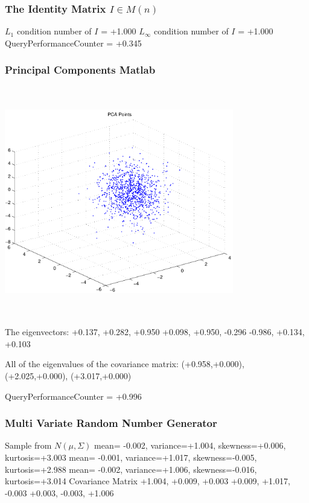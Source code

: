 \documentclass[9pt]{article}
\theoremstyle{plain}
\theoremstyle{definition}
\theoremstyle{remark}
\numberwithin{equation}{section}
\begin{document}
\subsubsection{The Identity Matrix $I \in M(n)$}
$L_1$ condition number of $I$ = +1.000
$L_\infty$ condition number of $I$ = +1.000
QueryPerformanceCounter  =  +0.345
\subsubsection{Principal Components Matlab }
\includegraphics[width=10.0cm,height=10.0cm]{PCAPoints.pdf}

The eigenvectors:
+0.137, +0.282, +0.950
+0.098, +0.950, -0.296
-0.986, +0.134, +0.103

All of the eigenvalues of the covariance matrix:
(+0.958,+0.000), (+2.025,+0.000), (+3.017,+0.000)

QueryPerformanceCounter  =  +0.996
\subsubsection{Multi Variate Random Number Generator }
Sample from $N(\mu,\Sigma)$
mean= -0.002, variance=+1.004, skewness=+0.006, kurtosis=+3.003
mean= -0.001, variance=+1.017, skewness=-0.005, kurtosis=+2.988
mean= -0.002, variance=+1.006, skewness=-0.016, kurtosis=+3.014
Covariance Matrix 
+1.004, +0.009, +0.003
+0.009, +1.017, -0.003
+0.003, -0.003, +1.006
\end{document}
